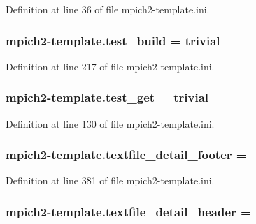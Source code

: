 Definition at line 36 of file mpich2-\/template.\-ini.

\hypertarget{namespacempich2-template_a74bcc1b555e44b4c152e7a6cba7bdd41}{
\subsubsection[{test\-\_\-build}]{\setlength{\rightskip}{0pt plus 5cm}mpich2-\/template.\-test\-\_\-build = trivial}}\label{namespacempich2-template_a74bcc1b555e44b4c152e7a6cba7bdd41}


Definition at line 217 of file mpich2-\/template.\-ini.

\hypertarget{namespacempich2-template_abf3c50e4ed6bd38b7845e7aa1d9b4a67}{
\subsubsection[{test\-\_\-get}]{\setlength{\rightskip}{0pt plus 5cm}mpich2-\/template.\-test\-\_\-get = trivial}}\label{namespacempich2-template_abf3c50e4ed6bd38b7845e7aa1d9b4a67}


Definition at line 130 of file mpich2-\/template.\-ini.

\hypertarget{namespacempich2-template_acc3253311ae65af2f39f6720e10f760f}{
\subsubsection[{textfile\-\_\-detail\-\_\-footer}]{\setlength{\rightskip}{0pt plus 5cm}mpich2-\/template.\-textfile\-\_\-detail\-\_\-footer =}}\label{namespacempich2-template_acc3253311ae65af2f39f6720e10f760f}


Definition at line 381 of file mpich2-\/template.\-ini.

\hypertarget{namespacempich2-template_a6d17bd61d7c5a8f4180328a9463887d5}{
\subsubsection[{textfile\-\_\-detail\-\_\-header}]{\setlength{\rightskip}{0pt plus 5cm}mpich2-\/template.\-textfile\-\_\-detail\-\_\-header =}}\label{namespacempich2-template_a6d17bd61d7c5a8f4180328a9463887d5}


